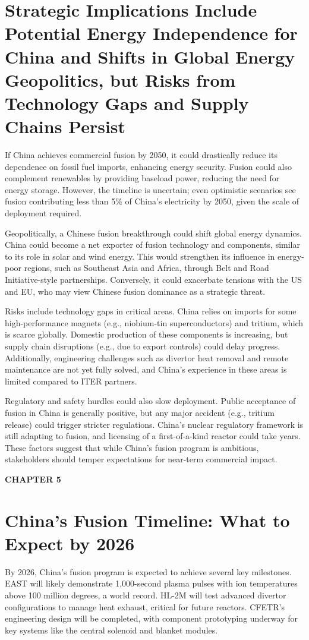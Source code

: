 \documentclass[11pt,a4paper]{article}
\newcommand{\kicker}[1]{\textcolor{BOBlue}{\scriptsize\bfseries\MakeUppercase{#1}}\\[-2pt]}
\newcommand{\lead}[1]{\textcolor{BOBlue}{\large #1}\par\vspace{3pt}}
\begin{document}
\section*{Strategic Implications Include Potential Energy Independence for China and Shifts in Global Energy Geopolitics, but Risks from Technology Gaps and Supply Chains Persist}
\lead{}
{\small If China achieves commercial fusion by 2050, it could drastically reduce its dependence on fossil fuel imports, enhancing energy security. Fusion could also complement renewables by providing baseload power, reducing the need for energy storage. However, the timeline is uncertain; even optimistic scenarios see fusion contributing less than 5\% of China's electricity by 2050, given the scale of deployment required.}

{\small Geopolitically, a Chinese fusion breakthrough could shift global energy dynamics. China could become a net exporter of fusion technology and components, similar to its role in solar and wind energy. This would strengthen its influence in energy-poor regions, such as Southeast Asia and Africa, through Belt and Road Initiative-style partnerships. Conversely, it could exacerbate tensions with the US and EU, who may view Chinese fusion dominance as a strategic threat.}

{\small Risks include technology gaps in critical areas. China relies on imports for some high-performance magnets (e.g., niobium-tin superconductors) and tritium, which is scarce globally. Domestic production of these components is increasing, but supply chain disruptions (e.g., due to export controls) could delay progress. Additionally, engineering challenges such as divertor heat removal and remote maintenance are not yet fully solved, and China's experience in these areas is limited compared to ITER partners.}

{\small Regulatory and safety hurdles could also slow deployment. Public acceptance of fusion in China is generally positive, but any major accident (e.g., tritium release) could trigger stricter regulations. China's nuclear regulatory framework is still adapting to fusion, and licensing of a first-of-a-kind reactor could take years. These factors suggest that while China's fusion program is ambitious, stakeholders should temper expectations for near-term commercial impact.}




\clearpage
\kicker{Chapter 5}
\section*{China's Fusion Timeline: What to Expect by 2026}
\lead{}
{\small By 2026, China's fusion program is expected to achieve several key milestones. EAST will likely demonstrate 1,000-second plasma pulses with ion temperatures above 100 million degrees, a world record. HL-2M will test advanced divertor configurations to manage heat exhaust, critical for future reactors. CFETR's engineering design will be completed, with component prototyping underway for key systems like the central solenoid and blanket modules.}
\end{document}

